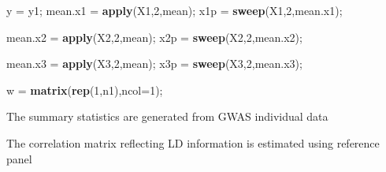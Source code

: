 \documentclass[]{article}
\newenvironment{Shaded}{\begin{snugshade}}{\end{snugshade}}
\newcommand{\KeywordTok}[1]{\textcolor[rgb]{0.13,0.29,0.53}{\textbf{#1}}}
\newcommand{\DataTypeTok}[1]{\textcolor[rgb]{0.13,0.29,0.53}{#1}}
\newcommand{\DecValTok}[1]{\textcolor[rgb]{0.00,0.00,0.81}{#1}}
\newcommand{\StringTok}[1]{\textcolor[rgb]{0.31,0.60,0.02}{#1}}
\newcommand{\ControlFlowTok}[1]{\textcolor[rgb]{0.13,0.29,0.53}{\textbf{#1}}}
\newcommand{\OperatorTok}[1]{\textcolor[rgb]{0.81,0.36,0.00}{\textbf{#1}}}
\newcommand{\NormalTok}[1]{#1}
\begin{document}
\begin{Shaded}
\begin{Highlighting}[]
\NormalTok{y =}\StringTok{ }\NormalTok{y1;}
\NormalTok{mean.x1 =}\StringTok{ }\KeywordTok{apply}\NormalTok{(X1,}\DecValTok{2}\NormalTok{,mean);}
\NormalTok{x1p =}\StringTok{ }\KeywordTok{sweep}\NormalTok{(X1,}\DecValTok{2}\NormalTok{,mean.x1);}

\NormalTok{mean.x2 =}\StringTok{ }\KeywordTok{apply}\NormalTok{(X2,}\DecValTok{2}\NormalTok{,mean);}
\NormalTok{x2p =}\StringTok{ }\KeywordTok{sweep}\NormalTok{(X2,}\DecValTok{2}\NormalTok{,mean.x2);}

\NormalTok{mean.x3 =}\StringTok{ }\KeywordTok{apply}\NormalTok{(X3,}\DecValTok{2}\NormalTok{,mean);}
\NormalTok{x3p =}\StringTok{ }\KeywordTok{sweep}\NormalTok{(X3,}\DecValTok{2}\NormalTok{,mean.x3);}

\NormalTok{w =}\StringTok{ }\KeywordTok{matrix}\NormalTok{(}\KeywordTok{rep}\NormalTok{(}\DecValTok{1}\NormalTok{,n1),}\DataTypeTok{ncol=}\DecValTok{1}\NormalTok{);}
\end{Highlighting}
\end{Shaded}

The summary statistics are generated from GWAS individual data

\begin{Shaded}
\end{Shaded}

The correlation matrix reflecting LD information is estimated using
reference panel
\end{document}
